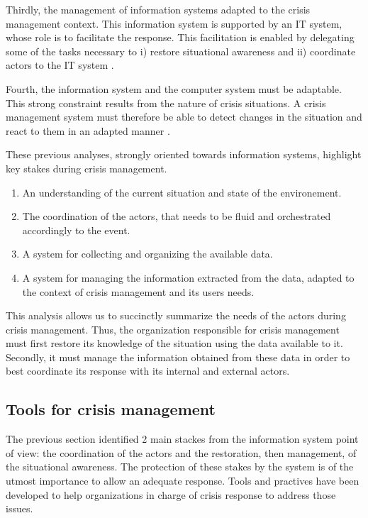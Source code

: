 Thirdly, the management of information systems adapted to the crisis management context.
This information system is supported by an IT system, whose role is to facilitate the response.
This facilitation is enabled by delegating some of the tasks necessary to i) restore situational awareness and ii) coordinate actors to the IT system \textcite{benabenManagementCollaborativeBehavior2015}.

Fourth, the information system and the computer system must be adaptable.
This strong constraint results from the nature of crisis situations.
A crisis management system must therefore be able to detect changes in the situation and react to them in an adapted manner \textcite{barthe-delanoeEventdrivenAgilityInteroperability2014,charlesModelDefineAssess2010}.

These previous analyses, strongly oriented towards information systems, highlight key stakes during crisis management.

\begin{enumerate}
    \item An understanding of the current situation and state of the environement.
    \item The coordination of the actors, that needs to be fluid and orchestrated accordingly to the event.
    \item A system for collecting and organizing the available data.
    \item A system for managing the information extracted from the data, adapted to the context of crisis management and its users needs.
\end{enumerate}

This analysis allows us to succinctly summarize the needs of the actors during crisis management.
Thus, the organization responsible for crisis management must first restore its knowledge of the situation using the data available to it.
Secondly, it must manage the information obtained from these data in order to best coordinate its response with its internal and external actors.

\subsection{Tools for crisis management}
The previous section identified 2 main stackes from the information system point of view: the coordination of the actors and the restoration, then management, of the situational awareness.
The protection of these stakes by the system is of the utmost importance to allow an adequate response.
Tools and practives have been developed to help organizations in charge of crisis response to address those issues.

